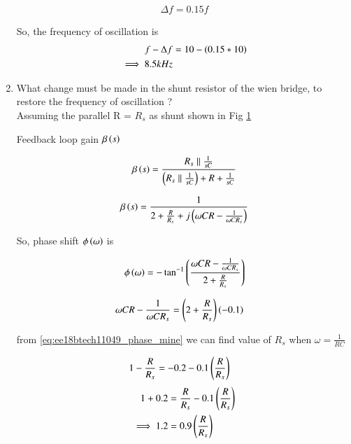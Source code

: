 \begin{enumerate}[label=\arabic*.,ref=\theenumi]
\begin{align}
\label{eq:ee18btech11049_freq}
    \Delta f = 0.15f
\end{align}

%
So, the frequency of oscillation is 
\begin{align}
\label{eq:ee18btech11049_freq}
    f - \Delta f &= 10-\brak{0.15*10}\\ 
    \implies 8.5 kHz
\end{align}

\item What change must be made in the shunt resistor of the wien bridge, to restore the frequency of oscillation ? \\
\solution Assuming the parallel R = $R_s$ as shunt shown in Fig \ref{fig:ee18btech11049_fig2}

\begin{figure}[!ht]
	\begin{center}
		\resizebox{\columnwidth}{!}{}
	\end{center}
\caption{}
\label{fig:ee18btech11049_fig2}
\end{figure}

Feedback loop gain $\beta\left(s\right)$

\begin{align}
\label{eq:ee18btech11049_beta}
    \beta\brak{s} = \frac{R_s \parallel \frac{1}{sC}}{\brak{R_s \parallel \frac{1}{sC}} + R + \frac{1}{sC}}
\end{align}

\begin{align}
\label{eq:ee18btech11049_freq}
    \beta\brak{s} = \frac{1}{2 + \frac{R}{R_s} + j\brak{\omega CR - \frac{1}{\omega CR_s}}}
\end{align}

So, phase shift $\phi\left(\omega\right)$ is

\begin{align}
\label{eq:ee18btech11049_phase_mine}
    \phi\brak{\omega}  = -\tan^{-1}\brak{\frac{\omega CR - \frac{1}{\omega CR_s}}{2+\frac{R}{R_s}}}
\end{align}


\begin{align}
    \omega CR - \frac{1}{\omega CR_s} &= \left(2+\frac{R}{R_s}\right) \left(-0.1\right)
\end{align}

from \ref{eq:ee18btech11049_phase_mine} we can find value of $R_s$ when $\omega = \frac{1}{RC}$ 

\begin{align}
   1- \frac{R}{R_s} &= -0.2 - 0.1\left(\frac{R}{R_s}\right) 
\end{align}
\begin{align}
   1 + 0.2  &= \frac{R}{R_s} - 0.1\left(\frac{R}{R_s}\right)  \\
   \implies 1.2 &= 0.9 \left(\frac{R}{R_s}\right)
\end{align}


\end{enumerate}
